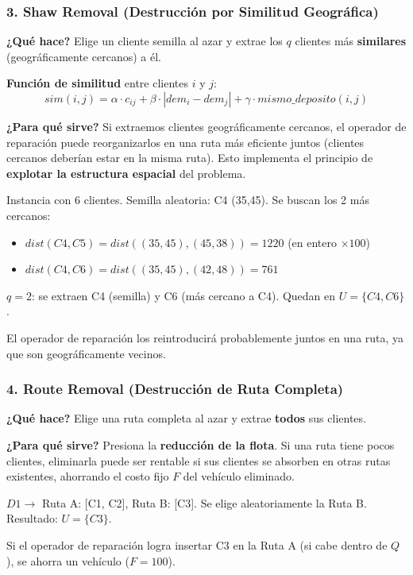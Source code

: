 \documentclass[12pt,a4paper]{article}
\begin{document}
\subsubsection{3. Shaw Removal (Destrucción por Similitud Geográfica)}

\textbf{¿Qué hace?} Elige un cliente semilla al azar y extrae los $q$ clientes más \textbf{similares} (geográficamente cercanos) a él.

\textbf{Función de similitud} entre clientes $i$ y $j$:
$$sim(i, j) = \alpha \cdot c_{ij} + \beta \cdot |dem_i - dem_j| + \gamma \cdot mismo\_deposito(i,j)$$

\textbf{¿Para qué sirve?} Si extraemos clientes geográficamente cercanos, el operador de reparación puede reorganizarlos en una ruta más eficiente juntos (clientes cercanos deberían estar en la misma ruta). Esto implementa el principio de \textbf{explotar la estructura espacial} del problema.

\begin{ejemplo}
Instancia con 6 clientes. Semilla aleatoria: C4 (35,45). Se buscan los 2 más cercanos:
\begin{itemize}
\item $dist(C4, C5) = dist((35,45),(45,38)) = 1220$ (en entero $\times 100$)
\item $dist(C4, C6) = dist((35,45),(42,48)) = 761$
\end{itemize}
$q=2$: se extraen C4 (semilla) y C6 (más cercano a C4). Quedan en $U = \{C4, C6\}$.

El operador de reparación los reintroducirá probablemente juntos en una ruta, ya que son geográficamente vecinos.
\end{ejemplo}

\subsubsection{4. Route Removal (Destrucción de Ruta Completa)}

\textbf{¿Qué hace?} Elige una ruta completa al azar y extrae \textbf{todos} sus clientes.

\textbf{¿Para qué sirve?} Presiona la \textbf{reducción de la flota}. Si una ruta tiene pocos clientes, eliminarla puede ser rentable si sus clientes se absorben en otras rutas existentes, ahorrando el costo fijo $F$ del vehículo eliminado.

\begin{ejemplo}
$D1 \to$ Ruta A: [C1, C2], Ruta B: [C3].
Se elige aleatoriamente la Ruta B.
Resultado: $U = \{C3\}$.

Si el operador de reparación logra insertar C3 en la Ruta A (si cabe dentro de $Q$), se ahorra un vehículo ($F=100$).
\end{ejemplo}
\end{document}
